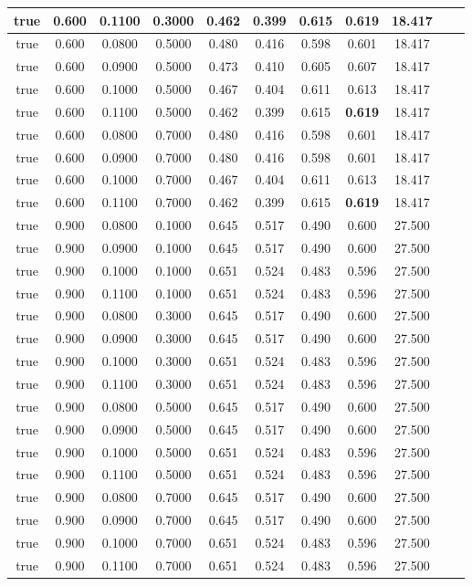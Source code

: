 \begin{longtable}[c]{|c|c|c|c|c|c|c|c|c|c|c|}
 true & 0.600 & 0.1100 & 0.3000 & 0.462 & 0.399 & 0.615 & \cellcolor{gray!20} \textbf{0.619} & 18.417  \\ \hline 
 true & 0.600 & 0.0800 & 0.5000 & 0.480 & 0.416 & 0.598 & 0.601 & 18.417  \\ \hline 
 true & 0.600 & 0.0900 & 0.5000 & 0.473 & 0.410 & 0.605 & 0.607 & 18.417  \\ \hline 
 true & 0.600 & 0.1000 & 0.5000 & 0.467 & 0.404 & 0.611 & 0.613 & 18.417  \\ \hline 
 true & 0.600 & 0.1100 & 0.5000 & 0.462 & 0.399 & 0.615 & \cellcolor{gray!20} \textbf{0.619} & 18.417  \\ \hline 
 true & 0.600 & 0.0800 & 0.7000 & 0.480 & 0.416 & 0.598 & 0.601 & 18.417  \\ \hline 
 true & 0.600 & 0.0900 & 0.7000 & 0.480 & 0.416 & 0.598 & 0.601 & 18.417  \\ \hline 
 true & 0.600 & 0.1000 & 0.7000 & 0.467 & 0.404 & 0.611 & 0.613 & 18.417  \\ \hline 
 true & 0.600 & 0.1100 & 0.7000 & 0.462 & 0.399 & 0.615 & \cellcolor{gray!20} \textbf{0.619} & 18.417  \\ \hline 
 true & 0.900 & 0.0800 & 0.1000 & 0.645 & 0.517 & 0.490 & 0.600 & 27.500  \\ \hline 
 true & 0.900 & 0.0900 & 0.1000 & 0.645 & 0.517 & 0.490 & 0.600 & 27.500  \\ \hline 
 true & 0.900 & 0.1000 & 0.1000 & 0.651 & 0.524 & 0.483 & 0.596 & 27.500  \\ \hline 
 true & 0.900 & 0.1100 & 0.1000 & 0.651 & 0.524 & 0.483 & 0.596 & 27.500  \\ \hline 
 true & 0.900 & 0.0800 & 0.3000 & 0.645 & 0.517 & 0.490 & 0.600 & 27.500  \\ \hline 
 true & 0.900 & 0.0900 & 0.3000 & 0.645 & 0.517 & 0.490 & 0.600 & 27.500  \\ \hline 
 true & 0.900 & 0.1000 & 0.3000 & 0.651 & 0.524 & 0.483 & 0.596 & 27.500  \\ \hline 
 true & 0.900 & 0.1100 & 0.3000 & 0.651 & 0.524 & 0.483 & 0.596 & 27.500  \\ \hline 
 true & 0.900 & 0.0800 & 0.5000 & 0.645 & 0.517 & 0.490 & 0.600 & 27.500  \\ \hline 
 true & 0.900 & 0.0900 & 0.5000 & 0.645 & 0.517 & 0.490 & 0.600 & 27.500  \\ \hline 
 true & 0.900 & 0.1000 & 0.5000 & 0.651 & 0.524 & 0.483 & 0.596 & 27.500  \\ \hline 
 true & 0.900 & 0.1100 & 0.5000 & 0.651 & 0.524 & 0.483 & 0.596 & 27.500  \\ \hline 
 true & 0.900 & 0.0800 & 0.7000 & 0.645 & 0.517 & 0.490 & 0.600 & 27.500  \\ \hline 
 true & 0.900 & 0.0900 & 0.7000 & 0.645 & 0.517 & 0.490 & 0.600 & 27.500  \\ \hline 
 true & 0.900 & 0.1000 & 0.7000 & 0.651 & 0.524 & 0.483 & 0.596 & 27.500  \\ \hline 
 true & 0.900 & 0.1100 & 0.7000 & 0.651 & 0.524 & 0.483 & 0.596 & 27.500  \\ \hline 
 \end{longtable} 
